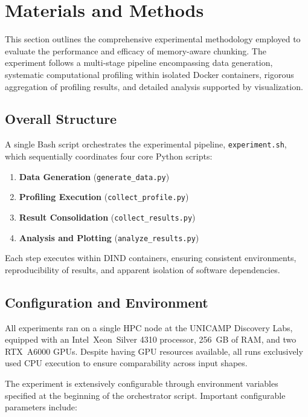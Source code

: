 \section{Materials and Methods}
\label{sec:idp-materials-methods}

This section outlines the comprehensive experimental methodology employed to evaluate the performance and efficacy of memory-aware chunking.
The experiment follows a multi-stage pipeline encompassing data generation, systematic computational profiling within isolated Docker containers, rigorous aggregation of profiling results, and detailed analysis supported by visualization.

\subsection*{Overall Structure}

A single Bash script orchestrates the experimental pipeline, \texttt{experiment.sh}, which sequentially coordinates four core Python scripts:

\begin{enumerate}
    \item \textbf{Data Generation} (\texttt{generate\_data.py})
    \item \textbf{Profiling Execution} (\texttt{collect\_profile.py})
    \item \textbf{Result Consolidation} (\texttt{collect\_results.py})
    \item \textbf{Analysis and Plotting} (\texttt{analyze\_results.py})
\end{enumerate}

Each step executes within \ac{DIND} containers, ensuring consistent environments, reproducibility of results, and apparent isolation of software dependencies.

\subsection*{Configuration and Environment}

All experiments ran on a single \ac{HPC} node at the \ac{UNICAMP} Discovery Labs, equipped with an Intel\textregistered\ Xeon\textregistered\ Silver 4310 processor, 256~\ac{GB} of \ac{RAM}, and two \ac{RTX}~A6000 \ac{GPU}s. Despite having \ac{GPU} resources available, all runs exclusively used \ac{CPU} execution to ensure comparability across input shapes.

The experiment is extensively configurable through environment variables specified at the beginning of the orchestrator script.
Important configurable parameters include:

